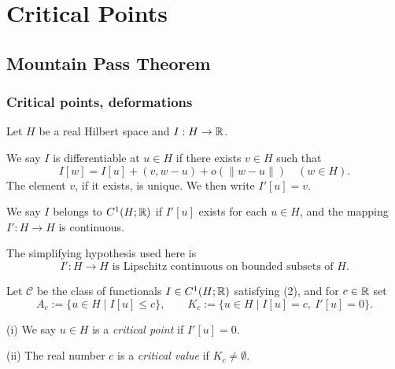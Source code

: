 \section{Critical Points}
\label{sec:critical-points-calculus-of-variations}

\subsection{Mountain Pass Theorem}
\label{sec:mountain-pass-theorem-section}

\subsubsection{Critical points, deformations}

Let $H$ be a real Hilbert space and $I:H\to\mathbb{R}$.

\begin{definition}
\label{def:frechet-derivative-hilbert-space}
We say $I$ is differentiable at $u \in H$ if there exists $v \in H$ such that
\[
I[w] = I[u] + (v, w - u) + o(\|w - u\|) \quad (w \in H).
\tag{1}
\]
The element $v$, if it exists, is unique. We then write $I'[u] = v$.
\end{definition}

\begin{definition}
\label{def:c1-functional-class-hilbert}

We say $I$ belongs to $C^1(H;\mathbb{R})$ if $I'[u]$ exists for each $u \in H$, and the mapping $I' : H \to H$ is continuous.
\end{definition}

\begin{remark}
\label{rem:lipschitz-derivative-simplification}

The simplifying hypothesis used here is
\[
I' : H \to H \text{ is Lipschitz continuous on bounded subsets of } H.
\tag{2}
\]
\end{remark}

Let $\mathcal C$ be the class of functionals $I\in C^1(H;\mathbb{R})$ satisfying (2), and for $c\in\mathbb{R}$ set
\[
A_c:=\{u\in H\mid I[u]\leq c\},
\qquad
K_c:=\{u\in H\mid I[u]=c,\ I'[u]=0\}.
\]

\begin{definition}
\label{def:critical-point-critical-value}

(i) We say $u \in H$ is a \textit{critical point} if $I'[u] = 0$.

(ii) The real number $c$ is a \textit{critical value} if $K_c \neq \emptyset$.
\end{definition}

